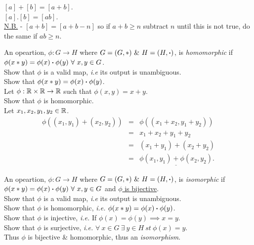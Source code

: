 \documentclass[11pt,a4paper]{article}
\begin{document}
$[a]+[b]=[a+b]$.\\
$[a].[b]=[ab]$.\\
\underline{N.B.} - $[a+b] = [a+b-n]$ so if $a + b \geq n$ subtract $n$ until this is not true, do the same if $ab \geq n$.\\


An opeartion, $\phi : G \to H$ where $G = (G, *)\ \&\ H=(H,\dotprod)$, is \textit{homomorphic} if\\
\-\hspace{2em}$\phi(x*y) = \phi(x) \dotprod\phi(y)\ \forall\ x, y \in G$.\\

Show that $\phi$ is a valid map, \textit{i.e} its output is unambiguous.\\
Show that $\phi(x*y) = \phi(x) \boldsymbol{\cdot}\phi(y)$.\\

\newpage{}
Let $\phi:\mathbb{R}\times\mathbb{R}\to\mathbb{R}$ such that $\phi(x, y) = x + y$.\\
Show that $\phi$ is homomorphic.\\

Let $x_1, x_2, y_1, y_2 \in \mathbb{R}$.\\
\[\begin{array}{rcl}
\phi((x_1, y_1) + (x_2, y_2)) &=& \phi((x_1 + x_2, y_1+y_2))\\
&=& x_1+x_2+y_1+y_2\\
&=&(x_1+y_1) + (x_2+y_2)\\
&=&\underline{\phi(x_1, y_1) + \phi(x_2, y_2)}.
\end{array}\]


An opeartion, $\phi : G \to H$ where $G = (G, *)\ \&\ H=(H,\dotprod)$, is \textit{isomorphic} if\\
\-\hspace{2em}$\phi(x*y) = \phi(x) \dotprod\phi(y)\ \forall\ x, y \in G$  and \underline{$\phi$ is bijective}.\\

Show that $\phi$ is a valid map, \textit{i.e} its output is unambiguous.\\
Show that $\phi$ is homomorphic, \textit{i.e.} $\phi(x*y) = \phi(x) \boldsymbol{\cdot}\phi(y)$.\\
Show that $\phi$ is injective, \textit{i.e.} If $\phi(x) = \phi(y) \implies x = y$.\\
Show that $\phi$ is surjective, \textit{i.e.} $\forall\ x \in G\ \exists\ y \in H\ st\ \phi(x) = y$.\\
Thus $\phi$ is bijective \& homomorphic, thus an \textit{isomorphism}.\\
\end{document}
